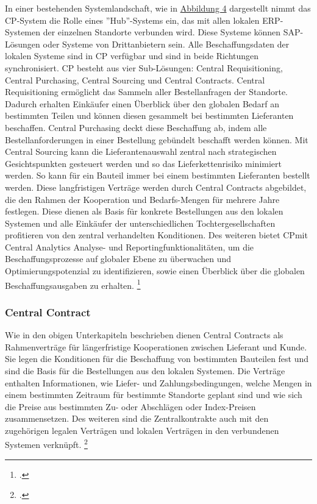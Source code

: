 In einer bestehenden Systemlandschaft, wie in \hyperref[fig:Central_Procurement_System_Landscape]{Abbildung 4} dargestellt nimmt das CP-System die Rolle eines ''Hub''-Systems ein, das mit allen lokalen ERP-Systemen der einzelnen Standorte verbunden wird. Diese Systeme können SAP-Lösungen oder Systeme von Drittanbietern sein. Alle Beschaffungsdaten der lokalen Systeme sind in CP verfügbar und sind in beide Richtungen synchronisiert. CP besteht aus vier Sub-Lösungen: Central Requisitioning, Central Purchasing, Central Sourcing und Central Contracts. Central Requisitioning ermöglicht  das Sammeln aller Bestellanfragen der Standorte. Dadurch erhalten Einkäufer einen Überblick über den globalen Bedarf an bestimmten Teilen und können diesen gesammelt bei bestimmten Lieferanten beschaffen. Central Purchasing deckt diese Beschaffung ab, indem alle Bestellanforderungen in einer Bestellung gebündelt beschafft werden können. Mit Central Sourcing kann die Lieferantenauswahl zentral nach strategischen Gesichtspunkten gesteuert werden und so das Lieferkettenrisiko minimiert werden. So kann \zB für ein Bauteil immer bei einem bestimmten Lieferanten bestellt werden. Diese langfristigen Verträge werden durch Central Contracts abgebildet, die den Rahmen der Kooperation und Bedarfs-Mengen für mehrere Jahre festlegen. Diese dienen als Basis für konkrete Bestellungen aus den lokalen Systemen und alle Einkäufer der unterschiedlichen Tochtergesellschaften profitieren von den zentral verhandelten Konditionen. Des weiteren bietet CPmit Central Analytics Analyse- und Reportingfunktionalitäten, um die Beschaffungsprozesse auf globaler Ebene zu überwachen und Optimierungspotenzial zu identifizieren, sowie einen Überblick über die globalen Beschaffungsausgaben zu erhalten. \footcite[Vgl.][]{theorie_sap_central_procurement_overview_2024}

\subsubsection{Central Contract}

Wie in den obigen Unterkapiteln beschrieben dienen Central Contracts als Rahmenverträge für längerfristige Kooperationen zwischen Lieferant und Kunde. Sie legen die Konditionen für die Beschaffung von bestimmten Bauteilen fest und sind die Basis für die Bestellungen aus den lokalen Systemen. Die Verträge enthalten Informationen, wie \zB Liefer- und Zahlungsbedingungen, welche Mengen in einem bestimmten Zeitraum für bestimmte Standorte geplant sind und wie sich die Preise aus bestimmten Zu- oder Abschlägen oder Index-Preisen zusammensetzen. Des weiteren sind die Zentralkontrakte auch mit den zugehörigen legalen Verträgen und lokalen Verträgen in den verbundenen Systemen verknüpft. \footcite[Vgl.][]{theorie_sap_central_contract_overview_2024}


